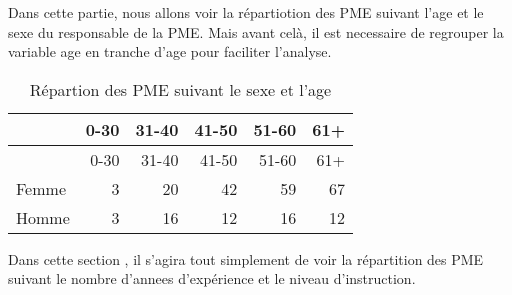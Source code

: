 \documentclass[
]{article}
\newenvironment{Shaded}{\begin{snugshade}}{\end{snugshade}}
\newcommand{\AttributeTok}[1]{\textcolor[rgb]{0.77,0.63,0.00}{#1}}
\newcommand{\CommentTok}[1]{\textcolor[rgb]{0.56,0.35,0.01}{\textit{#1}}}
\newcommand{\ConstantTok}[1]{\textcolor[rgb]{0.00,0.00,0.00}{#1}}
\newcommand{\DecValTok}[1]{\textcolor[rgb]{0.00,0.00,0.81}{#1}}
\newcommand{\FunctionTok}[1]{\textcolor[rgb]{0.00,0.00,0.00}{#1}}
\newcommand{\NormalTok}[1]{#1}
\newcommand{\OtherTok}[1]{\textcolor[rgb]{0.56,0.35,0.01}{#1}}
\newcommand{\SpecialCharTok}[1]{\textcolor[rgb]{0.00,0.00,0.00}{#1}}
\newcommand{\StringTok}[1]{\textcolor[rgb]{0.31,0.60,0.02}{#1}}
\begin{document}
Dans cette partie, nous allons voir la répartiotion des PME suivant
l'age et le sexe du responsable de la PME. Mais avant celà, il est
necessaire de regrouper la variable age en tranche d'age pour faciliter
l'analyse.

\begin{Shaded}
\end{Shaded}

\begin{longtable}[]{@{}lrrrrr@{}}
\caption{Répartion des PME suivant le sexe et l'age}\tabularnewline
\toprule()
& 0-30 & 31-40 & 41-50 & 51-60 & 61+ \\
\midrule()
\endfirsthead
\toprule()
& 0-30 & 31-40 & 41-50 & 51-60 & 61+ \\
\midrule()
\endhead
Femme & 3 & 20 & 42 & 59 & 67 \\
Homme & 3 & 16 & 12 & 16 & 12 \\
\bottomrule()
\end{longtable}

Dans cette section , il s'agira tout simplement de voir la répartition
des PME suivant le nombre d'annees d'expérience et le niveau
d'instruction.
\end{document}
